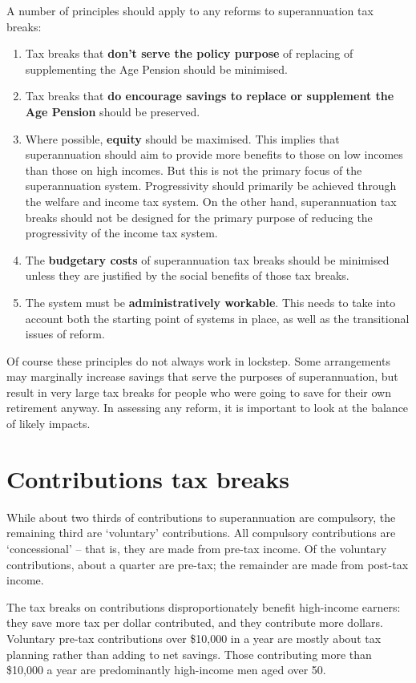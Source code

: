 A number of principles should apply to any reforms to superannuation tax breaks:
\begin{enumerate}
\item Tax breaks that \textbf{don't serve the policy purpose} of replacing of supplementing the Age Pension should be minimised.
\item	Tax breaks that \textbf{do encourage savings to replace or supplement the Age Pension} should be preserved. 
\item	Where possible, \textbf{equity} should be maximised. This implies that superannuation should aim to provide more benefits to those on low incomes than those on high incomes. But this is not the primary focus of the superannuation system. Progressivity should primarily be achieved through the welfare and income tax system. On the other hand, superannuation tax breaks should not be designed for the primary purpose of reducing the progressivity of the income tax system. 
\item	The \textbf{budgetary costs} of superannuation tax breaks should be minimised unless they are justified by the social benefits of those tax breaks.
\item	The system must be \textbf{administratively workable}. This needs to take into account both the starting point of systems in place, as well as the transitional issues of reform.
\end{enumerate}

Of course these principles do not always work in lockstep. Some arrangements may marginally increase savings that serve the purposes of superannuation, but result in very large tax breaks for people who were going to save for their own retirement anyway. In assessing any reform, it is important to look at the balance of likely impacts.



\chapter{Contributions tax breaks}
While about two thirds of contributions to superannuation are compulsory, the remaining third are ‘voluntary’ contributions. All compulsory contributions are ‘concessional’ – that is, they are made from pre-tax income. Of the voluntary contributions, about a quarter are pre-tax; the remainder are made from post-tax income.

The tax breaks on contributions disproportionately benefit high-income earners: they save more tax per dollar contributed, and they contribute more dollars. Voluntary pre-tax contributions over \$10,000 in a year are mostly about tax planning rather than adding to net savings. Those contributing more than \$10,000 a year are predominantly high-income men aged over 50. 

